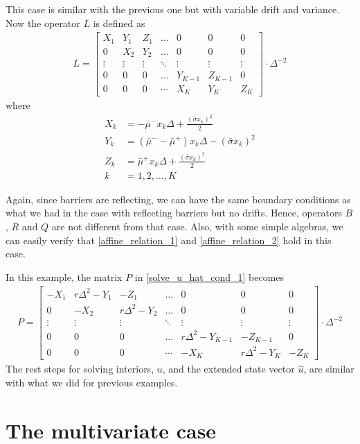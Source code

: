 \documentclass[11pt]{article}
\begin{document}
This case is similar with the previous one but with variable drift and variance. Now the operator $L$ is defined as
\begin{align}
L = \begin{bmatrix}
X_1&Y_1&Z_1&\dots&0&0&0\\
0&X_2&Y_2&\dots&0&0&0\\
\vdots&\vdots&\vdots&\ddots&\vdots&\vdots&\vdots\\
0&0&0&\dots&Y_{K-1}&Z_{K-1}&0\\
0&0&0&\cdots&X_{K}&Y_{K}&Z_{K}
\end{bmatrix}\cdot \Delta^{-2}\nonumber
\end{align}
where
\begin{align*}
X_k &= -\bar{\mu}^-x_k\Delta+\frac{(\bar{\sigma}x_k)^2}{2}\\
Y_k &= (\bar{\mu}^--\bar{\mu}^+)x_k\Delta-(\bar{\sigma}x_k)^2\\
Z_k &=\bar{\mu}^+x_k\Delta+\frac{(\bar{\sigma}x_k)^2}{2}\\
k & = 1, 2,\dots, K
\end{align*}

Again, since barriers are reflecting, we can have the same boundary conditions as what we had in the case with reflceting barriers but no drifts. Hence, operators $B$, $R$ and $Q$ are not different from that case. Also, with some simple algebras, we can easily verify that \eqref{affine_relation_1} and \eqref{affine_relation_2} hold in this case.

In this example, the matrix $P$ in \eqref{solve_u_hat_cond_1} becomes
\begin{align}
P = \begin{bmatrix}
-X_1&r\Delta^2-Y_1&-Z_1&\dots&0&0&0\\
0&-X_2&r\Delta^2-Y_2&\dots&0&0&0\\
\vdots&\vdots&\vdots&\ddots&\vdots&\vdots&\vdots\\
0&0&0&\dots&r\Delta^2-Y_{K-1}&-Z_{K-1}&0\\
0&0&0&\cdots&-X_K&r\Delta^2-Y_K&-Z_K
\end{bmatrix}\cdot \Delta^{-2}
\end{align}
The rest steps for solving interiors, $u$, and the extended state vector $\hat{u}$, are similar with what we did for previous examples.

\iffalse %
\section{The multivariate case}
\end{document}
